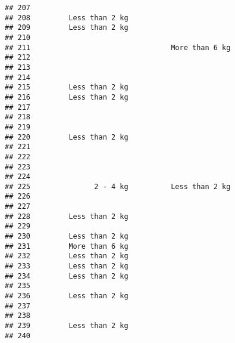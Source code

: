 \documentclass[
]{article}
\begin{document}
\begin{verbatim}
## 207                                                                      
## 208         Less than 2 kg                                               
## 209         Less than 2 kg                                               
## 210                                                                      
## 211                                 More than 6 kg                       
## 212                                                                      
## 213                                                                      
## 214                                                                      
## 215         Less than 2 kg                                               
## 216         Less than 2 kg                                               
## 217                                                                      
## 218                                                                      
## 219                                                                      
## 220         Less than 2 kg                                               
## 221                                                                      
## 222                                                                      
## 223                                                                      
## 224                                                                      
## 225               2 - 4 kg          Less than 2 kg                       
## 226                                                                      
## 227                                                                      
## 228         Less than 2 kg                                               
## 229                                                                      
## 230         Less than 2 kg                                               
## 231         More than 6 kg                                               
## 232         Less than 2 kg                                               
## 233         Less than 2 kg                                               
## 234         Less than 2 kg                                               
## 235                                                                      
## 236         Less than 2 kg                                               
## 237                                                                      
## 238                                                                      
## 239         Less than 2 kg                                               
## 240                                                                      

\end{verbatim}
\end{document}

